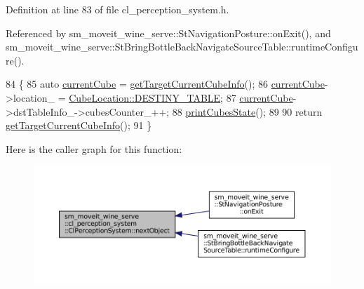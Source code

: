 Definition at line 83 of file cl\+\_\+perception\+\_\+system.\+h.



Referenced by sm\+\_\+moveit\+\_\+wine\+\_\+serve\+::\+St\+Navigation\+Posture\+::on\+Exit(), and sm\+\_\+moveit\+\_\+wine\+\_\+serve\+::\+St\+Bring\+Bottle\+Back\+Navigate\+Source\+Table\+::runtime\+Configure().


\begin{DoxyCode}
84             \{
85                 \textcolor{keyword}{auto} \hyperlink{classsm__moveit__wine__serve_1_1cl__perception__system_1_1ClPerceptionSystem_a2b902d074d73aac23e3525646e08d50f}{currentCube} = \hyperlink{classsm__moveit__wine__serve_1_1cl__perception__system_1_1ClPerceptionSystem_a13bcd31217e9eda88d966d3ec142a465}{getTargetCurrentCubeInfo}();
86                 \hyperlink{classsm__moveit__wine__serve_1_1cl__perception__system_1_1ClPerceptionSystem_a2b902d074d73aac23e3525646e08d50f}{currentCube}->location\_ = \hyperlink{namespacesm__moveit__wine__serve_1_1cl__perception__system_abb5953d380907809caaf4c1a83eec32cacdc3fdda18904b4a1ac0be036c86f973}{CubeLocation::DESTINY\_TABLE};
87                 \hyperlink{classsm__moveit__wine__serve_1_1cl__perception__system_1_1ClPerceptionSystem_a2b902d074d73aac23e3525646e08d50f}{currentCube}->dstTableInfo\_->cubesCounter\_++;
88                 \hyperlink{classsm__moveit__wine__serve_1_1cl__perception__system_1_1ClPerceptionSystem_a873b77957bc9fb25dba500389911ff0c}{printCubesState}();
89 
90                 \textcolor{keywordflow}{return} \hyperlink{classsm__moveit__wine__serve_1_1cl__perception__system_1_1ClPerceptionSystem_a13bcd31217e9eda88d966d3ec142a465}{getTargetCurrentCubeInfo}();
91             \}
\end{DoxyCode}
Here is the caller graph for this function\+:
\nopagebreak
\begin{figure}[H]
\begin{center}
\leavevmode
\includegraphics[width=350pt]{classsm__moveit__wine__serve_1_1cl__perception__system_1_1ClPerceptionSystem_abe32b5f5342f3e9ab6d9d46138ac1fc6_icgraph}
\end{center}
\end{figure}
